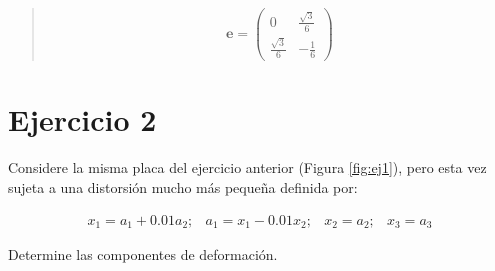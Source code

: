 \documentclass[a4paper,10pt,twoside,final,spanish]{article}
\begin{document}
\begin{quote}
\begin{minipage}{0.5\linewidth}
\end{minipage} \hfill \begin{minipage}{0.5\linewidth}

\[
\mathbf{e}=
\begin{pmatrix}
0                  & \frac{\sqrt{3}}{6} \\
\frac{\sqrt{3}}{6} & -\frac{1}{6}
\end{pmatrix}
\]

\end{minipage}

\end{quote}

\section*{Ejercicio 2}

Considere la misma placa del ejercicio anterior (Figura \ref{fig:ej1}), pero esta vez sujeta a una distorsión mucho más pequeña definida por: 

\[
\begin{array}{cccc}
x_{1}=a_{1}+0.01a_{2}; &
a_{1}=x_{1}-0.01x_{2}; &
x_{2}=a_{2};           &
x_{3}=a_{3}
\end{array}
\]

Determine las componentes de deformación.

\dotfill
\end{document}
